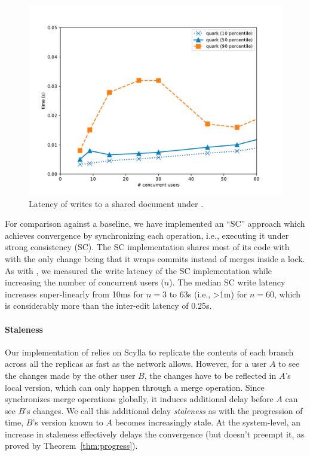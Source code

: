 \begin{figure}[ht]
  \centering
    \includegraphics[scale=0.4]{Figures/monkey_latency}
\caption{Latency of writes to a shared document under \quark. }
\label{fig:latency}
\vspace*{-0.2in}
\end{figure}

For comparison against a baseline, we have implemented an ``SC''
approach which achieves convergence by synchronizing each operation,
i.e., executing it under strong consistency (SC). The SC
implementation shares most of its code with \quark with the only
change being that it wraps commits instead of merges inside a lock.
As with \quark, we measured the write latency of the SC implementation
while increasing the number of concurrent users ($n$).  The median SC
write latency increases super-linearly from 10ms for $n=3$ to 63s
(i.e., >1m) for $n=60$, which is considerably more than the inter-edit
latency of 0.25s.


\noindent\paragraph{Staleness} Our implementation of \quark relies on
Scylla to replicate the contents of each branch across all the
replicas as fast as the network allows. However, for a user $A$ to see
the changes made by the other user $B$, the changes have to be
reflected in $A$'s local version, which can only happen through a
merge operation. Since \quark synchronizes merge operations globally,
it induces additional delay before $A$ can see $B$'s changes. We call
this additional delay \emph{staleness} as with the progression of
time, $B$'s version known to $A$ becomes increasingly stale. At the
system-level, an increase in staleness effectively delays the
convergence (but doesn't preempt it, as proved by
Theorem~\ref{thm:progress}). 

